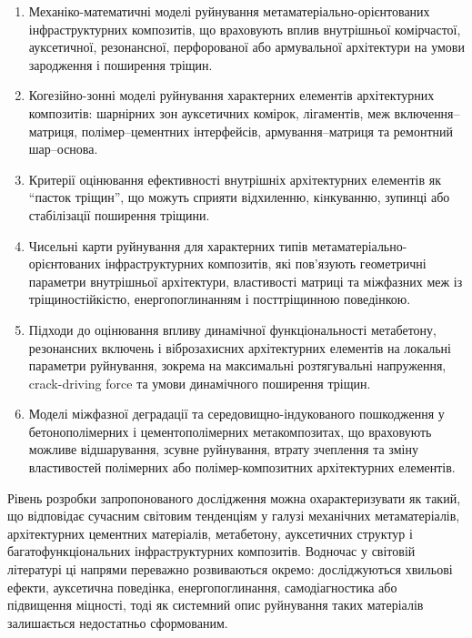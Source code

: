 \documentclass[12pt,a4paper]{article}
\begin{document}
\begin{enumerate}
	\item Механіко-математичні моделі руйнування метаматеріально-орієнтованих інфраструктурних композитів, що враховують вплив внутрішньої комірчастої, ауксетичної, резонансної, перфорованої або армувальної архітектури на умови зародження і поширення тріщин.

	\item Когезійно-зонні моделі руйнування характерних елементів архітектурних композитів: шарнірних зон ауксетичних комірок, лігаментів, меж включення--матриця, полімер--цементних інтерфейсів, армування--матриця та ремонтний шар--основа.
	
	\item Критерії оцінювання ефективності внутрішніх архітектурних елементів як ``пасток тріщин'', що можуть сприяти відхиленню, кiнкуванню, зупинці або стабілізації поширення тріщини.
	
	\item Чисельні карти руйнування для характерних типів метаматеріально-орієнтованих інфраструктурних композитів, які пов'язують геометричні параметри внутрішньої архітектури, властивості матриці та міжфазних меж із тріщиностійкістю, енергопоглинанням і посттріщинною поведінкою.
	
	\item Підходи до оцінювання впливу динамічної функціональності метабетону, резонансних включень і віброзахисних архітектурних елементів на локальні параметри руйнування, зокрема на максимальні розтягувальні напруження, crack-driving force та умови динамічного поширення тріщин.
	
	\item Моделі міжфазної деградації та середовищно-індукованого пошкодження у бетонополімерних і цементополімерних метакомпозитах, що враховують можливе відшарування, зсувне руйнування, втрату зчеплення та зміну властивостей полімерних або полімер-композитних архітектурних елементів.
	
\end{enumerate}

Рівень розробки запропонованого дослідження можна охарактеризувати як такий, що відповідає сучасним світовим тенденціям у галузі механічних метаматеріалів, архітектурних цементних матеріалів, метабетону, ауксетичних структур і багатофункціональних інфраструктурних композитів. Водночас у світовій літературі ці напрями переважно розвиваються окремо: досліджуються хвильові ефекти, ауксетична поведінка, енергопоглинання, самодіагностика або підвищення міцності, тоді як системний опис руйнування таких матеріалів залишається недостатньо сформованим.
\end{document}
